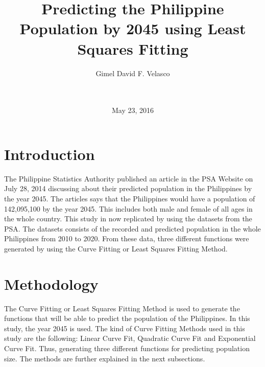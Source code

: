\documentclass{acm_proc_article-sp}
\begin{document}
\title{Predicting the Philippine Population by 2045 using Least Squares Fitting}

\author{
\alignauthor
    Gimel David F. Velasco\\
    \\
    \\
}


\date{May 23, 2016}

\maketitle


\section{Introduction}
The Philippine Statistics Authority published an article in the PSA Website on July 28, 2014 discussing about their predicted population in the Philippines by the year 2045. The articles says that the Philippines would have a population of 142,095,100 by the year 2045. This includes both male and female of all ages in the whole country. This study in now replicated by using the datasets from the PSA. The datasets consists of the recorded and predicted population in the whole Philippines from 2010 to 2020. From these data, three different functions were generated by using the Curve Fitting or Least Squares Fitting Method.

\section{Methodology}
The Curve Fitting or Least Squares Fitting Method is used to generate the functions that will be able to predict the population of the Philippines. In this study, the year 2045 is used. The kind of Curve Fitting Methods used in this study are the following: Linear Curve Fit, Quadratic Curve Fit and Exponential Curve Fit. Thus, generating three different functions for predicting population size. The methods are further explained in the next subsections.
\end{document}
